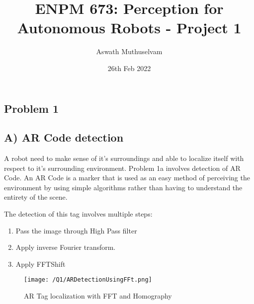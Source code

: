 \documentclass[a4paper, 10pt]{article}
\title{ENPM 673: Perception for Autonomous Robots - Project 1}
\author{Aswath Muthuselvam}
\date{26th Feb 2022}
\begin{document}
\maketitle
{}

\begin{multicols}{2}
	
\section{Problem 1}
\subsection{A) AR Code detection}

A robot need to make sense of it's surroundings and able to localize itself with respect to it's surrounding environment. Problem 1a involves detection of AR Code. An AR Code is a marker that is used as an easy method of perceiving the environment by using simple algorithms rather than having to understand the entirety of the scene.

The detection of this tag involves multiple steps:
\begin{enumerate}
	\item Pass the image through High Pass filter
		\item Apply inverse Fourier transform.
		\item Apply FFTShift
	
\end{enumerate}

\begin{figure}[H]
	\centering
	\texttt{[image: /Q1/ARDetectionUsingFFt.png]}
	\caption{AR Tag localization with FFT and Homography}
	\label{fig:FFT}
\end{figure}

\blindtext


\end{multicols}
\end{document}
